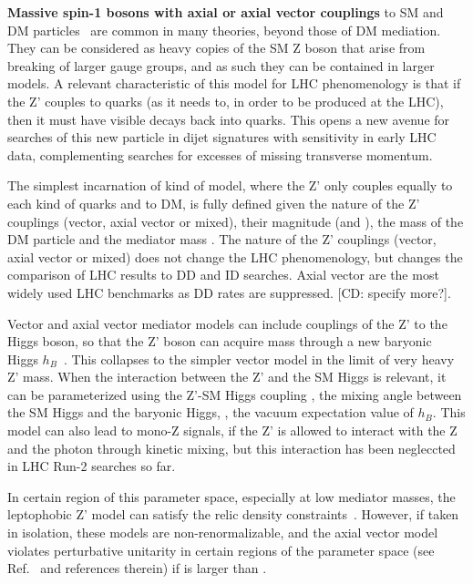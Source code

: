 
\textbf{Massive spin-1 bosons with axial or axial vector couplings} to SM and DM particles~\cite{Shoemaker:2011vi} are common in many theories, beyond those of DM mediation. They can be considered as heavy copies of the SM Z boson that arise from breaking of larger gauge groups, and as such they can be contained in larger models. A relevant characteristic of this model for LHC phenomenology is that if the Z' couples to quarks (as it needs to, in order to be produced at the LHC), then it must have visible decays back into quarks. This opens a new avenue for searches of this new particle in dijet signatures with sensitivity in early LHC data, complementing searches for excesses of missing transverse momentum. 

The simplest incarnation of kind of model, where the Z' only couples equally to each kind of quarks and to DM, is fully defined given the nature of the Z' couplings (vector, axial vector or mixed), their magnitude (\gq and \gDM), the mass of the DM particle \mdm and the mediator mass \mmed. The nature of the Z' couplings (vector, axial vector or mixed) does not change the LHC phenomenology, but changes the comparison of LHC results to DD and ID searches. Axial vector are the most widely used LHC benchmarks as DD rates are suppressed. [CD: specify more?]. 

Vector and axial vector mediator models can include couplings of the Z' to the Higgs boson, so that the Z' boson can acquire mass through a new baryonic Higgs $h_B$~\cite{Berlin:2014cfa}. This collapses to the simpler vector model in the limit of very heavy Z' mass. When the interaction between the Z' and the SM Higgs is relevant, it can be parameterized using the Z'-SM Higgs coupling \ghZprimeZprime, the mixing angle between the SM Higgs and the baryonic Higgs, \sinthetab, the vacuum expectation value of $h_B$. This model can also lead to mono-Z signals, if the Z' is allowed to interact with the Z and the photon through kinetic mixing, but this interaction has been negleccted in LHC Run-2 searches so far. 

In certain region of this parameter space, especially at low mediator masses, the leptophobic Z' model can satisfy the relic density constraints~\cite{Chala:2015ama}. However, if taken in isolation, these models are  non-renormalizable, and the axial vector model violates perturbative unitarity in certain regions of the parameter space (see Ref.~\cite{Boveia:2016mrp} and references therein) if \mdm is larger than \mmed. 

